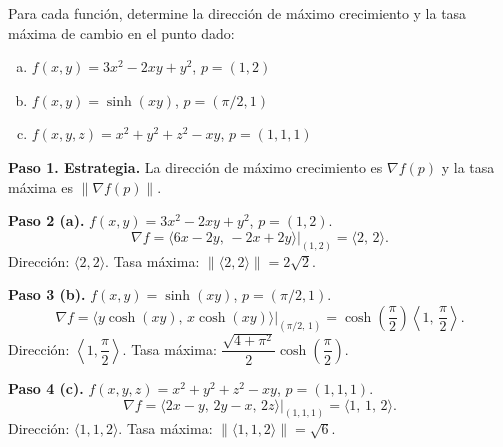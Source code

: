 \begin{prob}
Para cada función, determine la dirección de máximo crecimiento y la tasa
máxima de cambio en el punto dado:
\begin{enumerate}[a)]
    \item $f(x,y) = 3x^2 - 2xy + y^2$, $p=(1,2)$
    \item $f(x,y) = \sinh(xy)$, $p=(\pi/2,1)$
    \item $f(x,y,z) = x^2 + y^2 + z^2 - xy$, $p=(1,1,1)$
\end{enumerate}
\begin{myproof}
\textbf{Paso 1. Estrategia.}
La dirección de máximo crecimiento es $\nabla f(p)$ y la tasa máxima es $\|\nabla f(p)\|$.

\textbf{Paso 2 (a).} $f(x,y)=3x^2-2xy+y^2$, $p=(1,2)$.
\[
\nabla f=\langle 6x-2y,\,-2x+2y\rangle\big|_{(1,2)}=\langle 2,\,2\rangle.
\]
Dirección: $\langle 2,2\rangle$. Tasa máxima: $\|\langle 2,2\rangle\|=\boxed{2\sqrt{2}}$.

\textbf{Paso 3 (b).} $f(x,y)=\sinh(xy)$, $p=(\pi/2,1)$.
\[
\nabla f=\langle y\cosh(xy),\,x\cosh(xy)\rangle\big|_{(\pi/2,\,1)}
=\cosh\!\left(\frac{\pi}{2}\right)\left\langle 1,\,\frac{\pi}{2}\right\rangle.
\]
Dirección: $\left\langle 1,\dfrac{\pi}{2}\right\rangle$.
Tasa máxima: $\boxed{\dfrac{\sqrt{4+\pi^2}}{2}\cosh\!\left(\dfrac{\pi}{2}\right)}$.

\textbf{Paso 4 (c).} $f(x,y,z)=x^2+y^2+z^2-xy$, $p=(1,1,1)$.
\[
\nabla f=\langle 2x-y,\,2y-x,\,2z\rangle\big|_{(1,1,1)}=\langle 1,\,1,\,2\rangle.
\]
Dirección: $\langle 1,1,2\rangle$. Tasa máxima: $\|\langle 1,1,2\rangle\|=\boxed{\sqrt{6}}$.
\end{myproof}
\end{prob}

